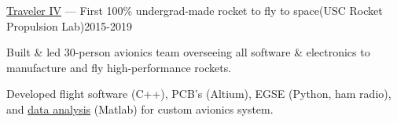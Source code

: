 \documentclass[letterpaper,10pt]{article}
\begin{document}
\begin{jobshort}{\href{https://cwhayes.squarespace.com/tech/rpl-tiv}{Traveler IV} --- First 100\% undergrad-made rocket to fly to space}{(USC Rocket Propulsion Lab)}{2015-2019}
    \item Built \& led 30-person avionics team overseeing all software \& electronics to manufacture and fly high-performance rockets.
    \item Developed flight software (C++), PCB's (Altium), EGSE (Python, ham radio), and 
    \href{https://static1.squarespace.com/static/549ce89be4b0cddb26c4894b/t/5ce58210e4966b7fc63fbe10/1558544951210/Traveler-IV-Whitepaper}{data analysis}
    (Matlab) for custom avionics system.
\end{jobshort}
\end{document}
